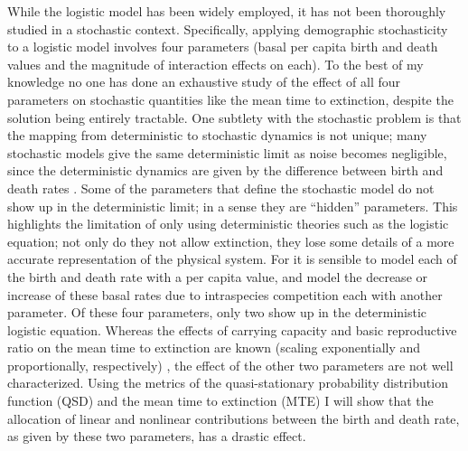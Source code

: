 While the logistic model has been widely employed, it has not been thoroughly studied in a stochastic context. 
Specifically, applying demographic stochasticity to a logistic model involves four parameters (basal per capita birth and death values and the magnitude of interaction effects on each). 
To the best of my knowledge no one has done an exhaustive study of the effect of all four parameters on stochastic quantities like the mean time to extinction, despite the solution being entirely tractable. 
%
One subtlety with the stochastic problem is that the mapping from deterministic to stochastic dynamics is not unique; many stochastic models give the same deterministic limit as noise becomes negligible, since the deterministic dynamics are given by the difference between birth and death rates \cite{Nisbet1982,Norden1982,Nasell2001,Rouzine2001,Gardiner2004a}. 
Some of the parameters that define the stochastic model do not show up in the deterministic limit; in a sense they are ``hidden'' parameters. 
This highlights the limitation of only using deterministic theories such as the logistic equation; not only do they not allow extinction, they lose some details of a more accurate representation of the physical system. 
For it is sensible to model each of the birth and death rate with a per capita value, and model the decrease or increase of these basal rates due to intraspecies competition each with another parameter. 
Of these four parameters, only two show up in the deterministic logistic equation. 
Whereas the effects of carrying capacity and basic reproductive ratio on the mean time to extinction are known (scaling exponentially and proportionally, respectively) \cite{Leigh1981,Lande1993,Foley1994}, the effect of the other two parameters are not well characterized. 
Using the metrics of the quasi-stationary probability distribution function (QSD) and the mean time to extinction (MTE) I will show that the allocation of linear and nonlinear contributions between the birth and death rate, as given by these two parameters, has a drastic effect. %


